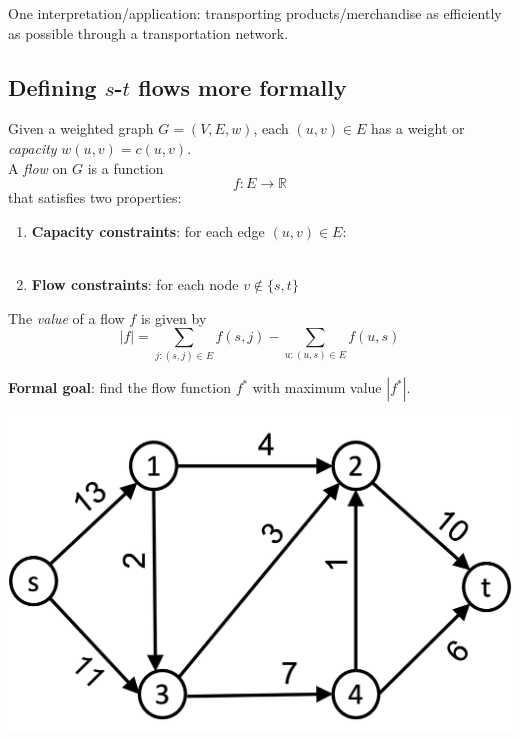 \documentclass[11  pt]{article}
\begin{document}
	One interpretation/application: transporting products/merchandise as efficiently as possible through a transportation network.
	
	
	\newpage
	
	\subsection{Defining $s$-$t$ flows more formally}
	Given a weighted graph $G = (V,E,w)$, each $(u,v) \in E$ has a weight or \emph{capacity} $w(u,v) = c(u,v)$. \\
	
	A \emph{flow} on $G$ is a function
	\begin{equation}
		f \colon E\rightarrow \mathbb{R}
	\end{equation}
	that satisfies two properties:
	\begin{enumerate}
		\item \textbf{Capacity constraints}: for each edge $(u,v) \in E$:\\ \\
		\item \textbf{Flow constraints}: for each node $v \notin \{s,t\}$ \\
	\end{enumerate}
	\vs{3cm}
	
	The \emph{value} of a flow $f$ is given by
	\begin{equation}
		|f| =  \sum_{ j\colon (s,j) \in E} f(s,j) - \sum_{u \colon (u,s) \in E} f(u,s)  
	\end{equation}
	
	\textbf{Formal goal}: find the flow function $f^*$ with maximum value $|f^*|$.
	
	\vs{1cm}
	
	\begin{center}
		\includegraphics[width = .5\linewidth]{flow1.png} \\
	\end{center}
	\newpage
	
\end{document}
